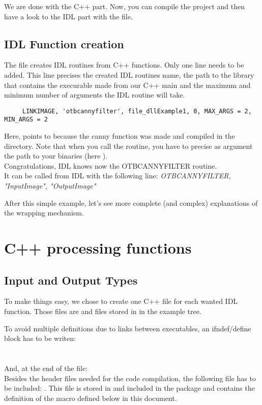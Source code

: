 We are done with the C++ part. Now, you can compile the project and then have a look to the IDL part with the  file.

\subsection{IDL Function creation}
The  file creates IDL routines from C++ functions.
Only one line needs to be added. This line precises the created IDL routines name, the path to the library that contains the execurable made from our C++ main and the maximum and minimum number of arguments the IDL routine will take.
\begin{verbatim}
     LINKIMAGE, 'otbcannyfilter', file_dllExample1, 0, MAX_ARGS = 2, MIN_ARGS = 2
\end{verbatim}

Here,  points to  because the canny function was made and compiled in the  directory.
Note that when you call the  routine, you have to precise as argument the path to your binaries (here ).\\
Congratulations, IDL knows now the OTBCANNYFILTER routine.\\
It can be called from IDL with the following line:
\emph {OTBCANNYFILTER, "InputImage", "OutputImage"}

After this simple example, let's see more complete (and complex) explanations of the wrapping mechanism.

\section{C++ processing functions}
\label{cfiles}
\subsection{Input and Output Types}
To make things easy, we chose to create one C++ file for each wanted IDL function. Those files are  and  files stored in  in the example tree.

To avoid multiple definitions due to links between executables, an ifndef/define block has to be writen:\\
\\
\\
And, at the end of the  file:
\\
Besides the header files needed for the code compilation, the following file has to be included: . This file is stored in  and included in the package and contains the definition of the  macro defined below in this document.


